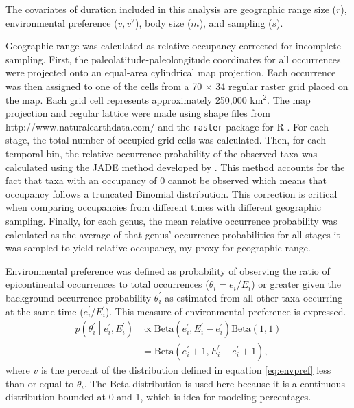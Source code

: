 \documentclass[11pt]{article}
\begin{document}
The covariates of duration included in this analysis are geographic range size (\(r\)), environmental preference (\(v, v^{2}\)), body size (\(m\)), and sampling (\(s\)).

Geographic range was calculated as relative occupancy corrected for incomplete sampling. First, the paleolatitude-paleolongitude coordinates for all occurrences were projected onto an equal-area cylindrical map projection. Each occurrence was then assigned to one of the cells from a 70 \(\times\) 34 regular raster grid placed on the map. Each grid cell represents approximately 250,000 km\(^{2}\). The map projection and regular lattice were made using shape files from http://www.naturalearthdata.com/ and the \texttt{raster} package for R \citep{raster}. For each stage, the total number of occupied grid cells was calculated. Then, for each temporal bin, the relative occurrence probability of the observed taxa was calculated using the \uppercase{jade} method developed by \citet{Chao2015a}. This method accounts for the fact that taxa with an occupancy of 0 cannot be observed which means that occupancy follows a truncated Binomial distribution. This correction is critical when comparing occupancies from different times with different geographic sampling. Finally, for each genus, the mean relative occurrence probability was calculated as the average of that genus' occurrence probabilities for all stages it was sampled to yield relative occupancy, my proxy for geographic range.

Environmental preference was defined as probability of observing the ratio of epicontinental occurrences to total occurrences (\(\theta_{i} = e_{i} / E_{i}\)) or greater given the background occurrence probability \(\theta^{\prime}_{i}\) as estimated from all other taxa occurring at the same time (\(e^{\prime}_{i} / E^{\prime}_{i}\)). This measure of environmental preference is expressed.
\begin{equation}
  \begin{aligned}
    p\left(\theta^{\prime}_{i} \middle| e^{\prime}_{i}, E^{\prime}_{i} \right) &\propto \mathrm{Beta}(e^{\prime}_{i}, E^{\prime}_{i} - e^{\prime}_{i}) \mathrm{Beta}(1, 1) \\
    &= \mathrm{Beta}(e^{\prime}_{i} + 1, E^{\prime}_{i} - e^{\prime}_{i} + 1),
  \end{aligned}
  \label{eq:envpref}
\end{equation}
where \(v\) is the percent of the distribution defined in equation \ref{eq:envpref} less than or equal to \(\theta_{i}\). The Beta distribution is used here because it is a continuous distribution bounded at 0 and 1, which is idea for modeling percentages.
\end{document}
